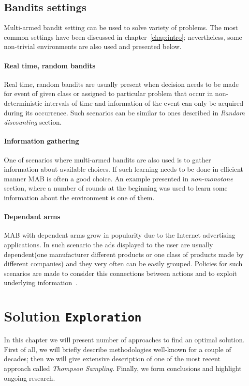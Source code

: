 \documentclass[12pt, a4paper, pdflatex, leqno]{report}
\begin{document}
\section{Bandits settings}
Multi-armed bandit setting can be used to solve variety of problems. The most common settings have been discussed in chapter~\ref{chap:intro}; nevertheless, some non-trivial environments are also used and presented below.\\
\subsubsection{Real time, random bandits}
Real time, random bandits are usually present when decision needs to be made for event of given class or assigned to particular problem that occur in non-deterministic intervals of time and information of the event can only be acquired during its occurrence. Such scenarios can be similar to ones described in \emph{Random discounting} section.\\
\subsubsection{Information gathering}
One of scenarios where multi-armed bandits are also used is to gather information about available choices. If such learning needs to be done in efficient manner MAB is often a good choice. An example presented in \emph{non-monotone} section, where a number of rounds at the beginning was used to learn some information about the environment is one of them.\\
\subsubsection{Dependant arms}
MAB with dependent arms grow in popularity due to the Internet advertising applications. In such scenario the ads displayed to the user are usually dependent(one manufacturer different products or one class of products made by different companies) and they very often can be easily grouped. Policies for such scenarios are made to consider this connections between actions and to exploit underlying information~\citep{Pandey:2007:MBP:1273496.1273587}.\\





\chapter{Solution \texttt{\textbf{Exploration}}}
In this chapter we will present number of approaches to find an optimal solution. First of all, we will briefly describe methodologies well-known for a couple of decades; then we will give extensive description of one of the most recent approach called \emph{Thompson Sampling}. Finally, we form conclusions and highlight ongoing research.\\
\end{document}
